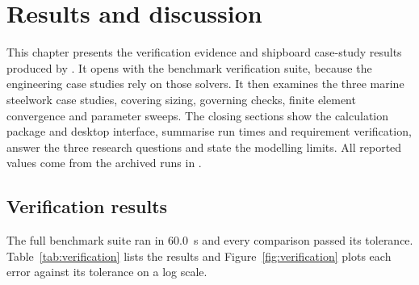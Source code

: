 \chapter{Results and discussion}
\label{chap:results}

This chapter presents the verification evidence and shipboard case-study
results produced by \NEMO{}. It opens with the benchmark verification suite,
because the engineering case studies rely on those solvers. It then examines
the three marine steelwork case studies, covering sizing, governing checks,
finite element convergence and parameter sweeps. The closing sections show
the calculation package and desktop interface, summarise run times and
requirement verification, answer the three research questions and state the
modelling limits. All reported values come from the archived runs in
.

\section{Verification results}
\label{sec:verification-results}

The full benchmark suite ran in 60.0~s and every comparison passed its
tolerance. Table~\ref{tab:verification} lists the results and
Figure~\ref{fig:verification} plots each error against its tolerance on a log
scale.

